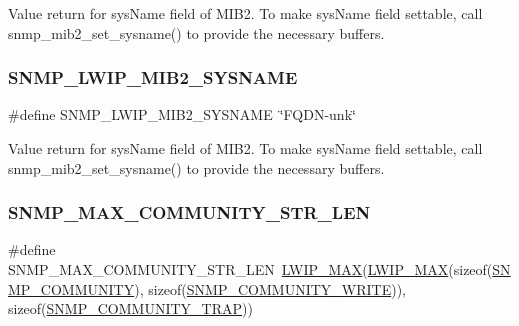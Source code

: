 Value return for sys\+Name field of M\+I\+B2. To make sys\+Name field settable, call snmp\+\_\+mib2\+\_\+set\+\_\+sysname() to provide the necessary buffers. \mbox{\label{group__snmp__opts_ga80ba46f9517a51b5477f13082b2bcf98}} 
\subsubsection{\texorpdfstring{S\+N\+M\+P\+\_\+\+L\+W\+I\+P\+\_\+\+M\+I\+B2\+\_\+\+S\+Y\+S\+N\+A\+ME}{SNMP\_LWIP\_MIB2\_SYSNAME}\hspace{0.1cm}{\footnotesize\ttfamily [2/2]}}
{\footnotesize\ttfamily \#define S\+N\+M\+P\+\_\+\+L\+W\+I\+P\+\_\+\+M\+I\+B2\+\_\+\+S\+Y\+S\+N\+A\+ME~\char`\"{}F\+Q\+DN-\/unk\char`\"{}}

Value return for sys\+Name field of M\+I\+B2. To make sys\+Name field settable, call snmp\+\_\+mib2\+\_\+set\+\_\+sysname() to provide the necessary buffers. \mbox{\label{group__snmp__opts_ga0e98b58159a77688f87f9f50479177fd}} 
\subsubsection{\texorpdfstring{S\+N\+M\+P\+\_\+\+M\+A\+X\+\_\+\+C\+O\+M\+M\+U\+N\+I\+T\+Y\+\_\+\+S\+T\+R\+\_\+\+L\+EN}{SNMP\_MAX\_COMMUNITY\_STR\_LEN}\hspace{0.1cm}{\footnotesize\ttfamily [1/2]}}
{\footnotesize\ttfamily \#define S\+N\+M\+P\+\_\+\+M\+A\+X\+\_\+\+C\+O\+M\+M\+U\+N\+I\+T\+Y\+\_\+\+S\+T\+R\+\_\+\+L\+EN~\hyperlink{openmote-cc2538_2lwip_2src_2include_2lwip_2def_8h_a21ea174d374106caeafb4aa3a24fbd2b}{L\+W\+I\+P\+\_\+\+M\+AX}(\hyperlink{openmote-cc2538_2lwip_2src_2include_2lwip_2def_8h_a21ea174d374106caeafb4aa3a24fbd2b}{L\+W\+I\+P\+\_\+\+M\+AX}(sizeof(\hyperlink{group__snmp__opts_ga316c1e1f06f0c7ca56589563809e64db}{S\+N\+M\+P\+\_\+\+C\+O\+M\+M\+U\+N\+I\+TY}), sizeof(\hyperlink{group__snmp__opts_gafb9414dc7a33978b62a3a9838b659464}{S\+N\+M\+P\+\_\+\+C\+O\+M\+M\+U\+N\+I\+T\+Y\+\_\+\+W\+R\+I\+TE})), sizeof(\hyperlink{group__snmp__opts_gaaefc9dda5f8e5c296018a463cdbac39b}{S\+N\+M\+P\+\_\+\+C\+O\+M\+M\+U\+N\+I\+T\+Y\+\_\+\+T\+R\+AP}))}

